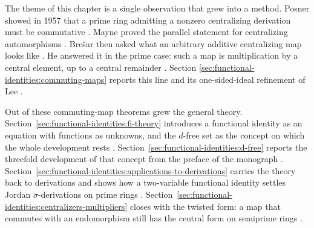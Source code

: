 The theme of this chapter is a single observation that grew into a method.
Posner showed in 1957 that a prime ring admitting a nonzero centralizing
derivation must be commutative
\cite[p.~385]{Bresar1993}. Mayne proved the parallel statement
for centralizing automorphisms \cite[p.~385]{Bresar1993}.
Bre\v{s}ar then asked what an arbitrary additive centralizing map looks
like \cite[p.~385]{Bresar1993}. He answered it in the prime
case: such a map is multiplication by a central element, up to a central
remainder \cite[Theorem~A, p.~385]{Bresar1993}. Section
\ref{sec:functional-identities:commuting-maps} reports this line and its
one-sided-ideal refinement of Lee
\cite[Theorem~2, p.~335]{LeeTK1997Centralizing}.

Out of these commuting-map theorems grew the general theory.
Section~\ref{sec:functional-identities:fi-theory} introduces a functional
identity as an equation with functions as unknowns, and the $d$-free set
as the concept on which the whole development rests
\cite[p.~9 and p.~x]{BresarMartindaleChebotar2007FI}.
Section~\ref{sec:functional-identities:d-free} reports the threefold
development of that concept from the preface of the monograph
\cite[p.~x]{BresarMartindaleChebotar2007FI}.
Section~\ref{sec:functional-identities:applications-to-derivations}
carries the theory back to derivations and shows how a two-variable
functional identity settles Jordan $\sigma$-derivations on prime rings
\cite[Theorem~2.1, p.~221]{LeeTK2015JordanFI}.
Section~\ref{sec:functional-identities:centralizers-multipliers} closes
with the twisted form: a map that commutes with an endomorphism still has
the central form on semiprime rings
\cite[Theorem~2, p.~2948]{LeeTK2001SigmaCommuting}.

